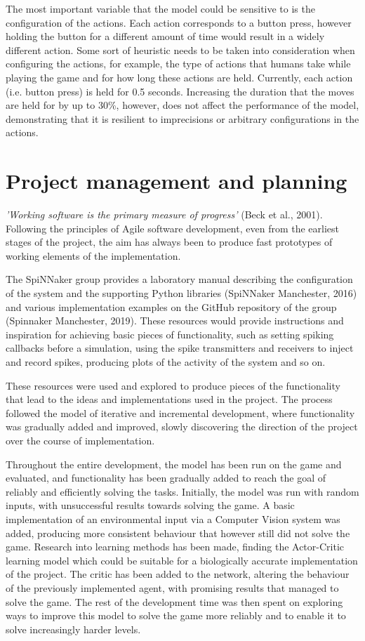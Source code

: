 \documentclass[10pt]{article}
\begin{document}
    The most important variable that the model could be sensitive to is the configuration of the actions. Each action corresponds to a button press, however holding the button for a different amount of time would result in a widely different action. Some sort of heuristic needs to be taken into consideration when configuring the actions, for example, the type of actions that humans take while playing the game and for how long these actions are held. Currently, each action (i.e. button press) is held for 0.5 seconds. Increasing the duration that the moves are held for by up to 30\%, however, does not affect the performance of the model, demonstrating that it is resilient to imprecisions or arbitrary configurations in the actions.

    \section{Project management and planning}

    \textit{'Working software is the primary measure of progress'} (Beck et al., 2001). Following the principles of Agile software development, even from the earliest stages of the project, the aim has always been to produce fast prototypes of working elements of the implementation.

    The SpiNNaker group provides a laboratory manual describing the configuration of the system and the supporting Python libraries (SpiNNaker Manchester, 2016) and various implementation examples on the GitHub repository of the group (Spinnaker Manchester, 2019). These resources would provide instructions and inspiration for achieving basic pieces of functionality, such as setting spiking callbacks before a simulation, using the spike transmitters and receivers to inject and record spikes, producing plots of the activity of the system and so on.

    These resources were used and explored to produce pieces of the functionality that lead to the ideas and implementations used in the project. The process followed the model of iterative and incremental development, where functionality was gradually added and improved, slowly discovering the direction of the project over the course of implementation.

    Throughout the entire development, the model has been run on the game and evaluated, and functionality has been gradually added to reach the goal of reliably and efficiently solving the tasks. Initially, the model was run with random inputs, with unsuccessful results towards solving the game. A basic implementation of an environmental input via a Computer Vision system was added, producing more consistent behaviour that however still did not solve the game. Research into learning methods has been made, finding the Actor-Critic learning model which could be suitable for a biologically accurate implementation of the project. The critic has been added to the network, altering the behaviour of the previously implemented agent, with promising results that managed to solve the game. The rest of the development time was then spent on exploring ways to improve this model to solve the game more reliably and to enable it to solve increasingly harder levels.
\end{document}
